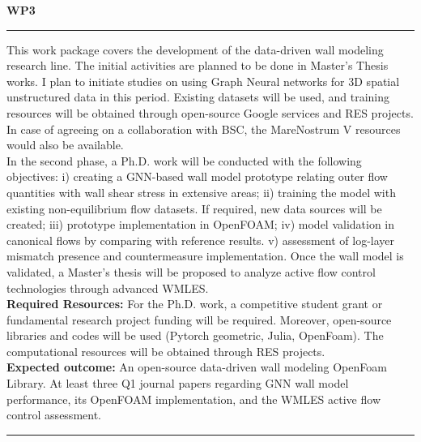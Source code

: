 \documentclass{article}
\begin{document}
\vspace{0.5cm}

{ \bf WP3 }
\vspace{4pt}
\hrule

This work package covers the development of the data-driven wall modeling research line. The initial activities are planned to be done in Master's Thesis works. I plan to initiate studies on using Graph Neural networks for 3D spatial unstructured data in this period. Existing datasets will be used, and training resources will be obtained through open-source Google services and RES projects. In case of agreeing on a collaboration with BSC, the MareNostrum V resources would also be available.\\
In the second phase, a Ph.D. work will be conducted with the following objectives: i) creating a GNN-based wall model prototype relating outer flow quantities with wall shear stress in extensive areas; ii) training the model with existing non-equilibrium flow datasets. If required, new data sources will be created; iii) prototype implementation in OpenFOAM;  iv) model validation in canonical flows by comparing with reference results. v) assessment of log-layer mismatch presence and countermeasure implementation. Once the wall model is validated, a Master's thesis will be proposed to analyze active flow control technologies through advanced WMLES.\\
{\bf Required Resources:} For the Ph.D. work, a competitive student grant or fundamental research project funding will be required. Moreover, open-source libraries and codes will be used (Pytorch geometric, Julia, OpenFoam). The computational resources will be obtained through RES projects.  \\
{\bf Expected outcome:} An open-source data-driven wall modeling OpenFoam Library. At least three Q1 journal papers regarding GNN wall model performance, its OpenFOAM implementation, and the WMLES active flow control assessment.
\vspace{4pt}
\hrule

\newpage
\end{document}
